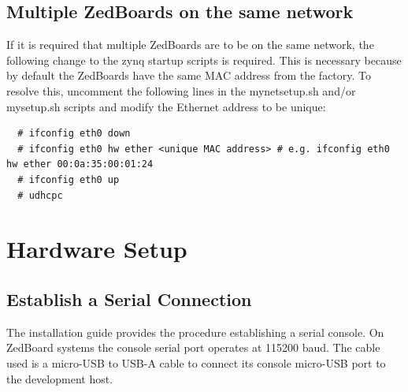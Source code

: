 \subsection{Multiple ZedBoards on the same network}
\label{sec:Multiple ZedBoards on the same network}
If it is required that multiple ZedBoards are to be on the same network, the following change to the zynq startup scripts is required. This is necessary because by default the ZedBoards have the same MAC address from the factory. To resolve this, uncomment the following lines in the mynetsetup.sh and/or mysetup.sh scripts and modify the Ethernet address to be unique:
\begin{verbatim}
  # ifconfig eth0 down
  # ifconfig eth0 hw ether <unique MAC address> # e.g. ifconfig eth0 hw ether 00:0a:35:00:01:24
  # ifconfig eth0 up
  # udhcpc
\end{verbatim}

\pagebreak
\section{Hardware Setup}

\subsection{Establish a Serial Connection}
The installation guide provides the procedure establishing a serial console.  On ZedBoard systems the console serial port operates at 115200 baud.  The cable used is a micro-USB to USB-A cable to connect its console micro-USB port to the development host.

